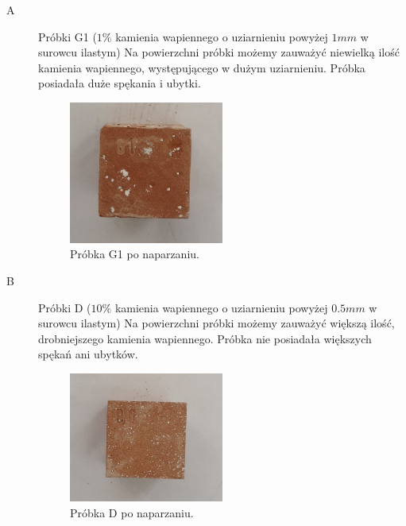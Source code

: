 \begin{description}
    \item[A] Próbki G1 ($1\%$ kamienia wapiennego o uziarnieniu powyżej $1mm$ w surowcu ilastym)
    \newline
    \newline
    Na powierzchni próbki możemy zauważyć niewielką ilość kamienia wapiennego, występującego w dużym uziarnieniu. Próbka posiadała duże spękania i ubytki.

    \begin{figure}[H]
        \begin{center}
            \includegraphics[width=0.5\textwidth]{img/G1.jpg}           
            \caption{Próbka G1 po naparzaniu.}
        \end{center}
    \end{figure}

    \newpage

    \item[B] Próbki D ($10\%$ kamienia wapiennego o uziarnieniu powyżej $0.5mm$ w surowcu ilastym)
     \newline
    Na powierzchni próbki możemy zauważyć większą ilość, drobniejszego kamienia wapiennego. Próbka nie posiadała większych spękań ani ubytków.

    \begin{figure}[H]
        \begin{center}
            \includegraphics[width=0.5\textwidth]{img/D.jpg}           
            \caption{Próbka D po naparzaniu.}
        \end{center}
    \end{figure}


\end{description}
